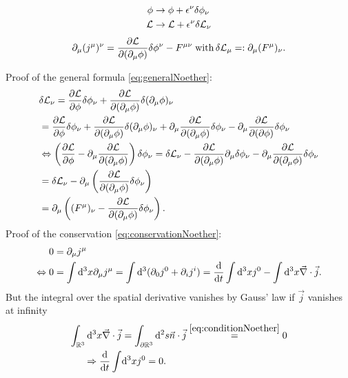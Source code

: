 \begin{align}
	\phi& \rightarrow \phi + \epsilon^\nu \delta \phi_\nu \\
	\mathcal{L}&\rightarrow \mathcal{L} + \epsilon^\nu \delta \mathcal{L}_\nu 
\end{align}
\begin{equation}
		\partial_\mu (j^\mu)^\nu = \frac{\partial \mathcal{L}}{\partial (\partial_\mu \phi)} \delta \phi^\nu - F^{\mu \nu} \; \mathrm{with}\, \delta \mathcal{L}_\mu =: \partial_\mu(F^\mu)_\nu.\label{eq:generalNoether}
\end{equation}

Proof of the general formula \ref{eq:generalNoether}:
\begin{align*}
	&\delta \mathcal{L}_\nu = \frac{\partial \mathcal{L}}{\partial \phi} \delta \phi_\nu + \frac{\partial \mathcal{L}}{\partial(\partial_\mu \phi)} \delta(\partial_\mu \phi)_\nu \\
	&=\frac{\partial \mathcal{L}}{\partial \phi} \delta \phi_\nu + \frac{\partial \mathcal{L}}{\partial(\partial_\mu \phi)} \delta(\partial_\mu \phi)_\nu + \partial_\mu \frac{\partial \mathcal{L}}{\partial(\partial_\mu \phi)} \delta \phi_\nu - \partial_\mu \frac{\partial \mathcal{L}}{\partial(\partial \phi)} \delta \phi_\nu \\
	&\Leftrightarrow \left(\frac{\partial \mathcal{L}}{\partial \phi} - \partial_\mu \frac{\partial \mathcal{L}}{\partial(\partial_\mu \phi)}\right) \delta \phi_\nu = \delta \mathcal{L}_\nu - \frac{\partial \mathcal{L}}{\partial(\partial_\mu \phi)} \partial_\mu \delta \phi_\nu - \partial_\mu \frac{\partial \mathcal{L}}{\partial(\partial_\mu \phi)} \delta \phi_\nu \\
	&= \delta \mathcal{L}_\nu - \partial_\mu \left(\frac{\partial \mathcal{L}}{\partial(\partial_\mu \phi)} \delta \phi_\nu\right) \\
	&= \partial_\mu \left((F^\mu)_\nu - \frac{\partial \mathcal{L}}{\partial(\partial_\mu \phi)} \delta \phi_\nu \right).
\end{align*}
Proof of the conservation \ref{eq:conservationNoether}:
\begin{align*}
	0&= \partial_\mu j^\mu \\
	\Leftrightarrow 0 &= \int \mathrm{d}^3 x \partial_\mu j^\mu = \int \mathrm{d}^3(\partial_0 j^0 + \partial_i j^i) = \frac{\mathrm{d}}{\mathrm{d} t} \int \mathrm{d}^3 x j^0 - \int \mathrm{d}^3 x \vec{\nabla} \cdot \vec{j}.
\end{align*}
But the integral over the spatial derivative vanishes by Gauss' law if $\vec{j}$ vanishes at infinity
\begin{align*}
	\int_{\mathbb{R}^3} \mathrm{d}^3 x \vec{\nabla}\cdot \vec{j} &= \int_{\partial\mathbb{R}^3} \mathrm{d}^2s \vec{n}\cdot \vec{j} \stackrel{\ref{eq:conditionNoether}}{=}0 \\
	\Rightarrow \frac{\mathrm{d}}{\mathrm{d} t} \int& \mathrm{d}^3 x j^0 =0.
\end{align*}

